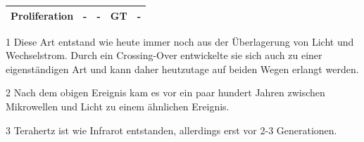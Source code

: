 \begin{table}[hbt]
\begin{threeparttable}
\begin{tabularx}{0.9\textwidth}{lcXcX}
			Proliferation &     -     &         -         &     GT      &        - \\ 
			\bottomrule
		\end{tabularx}
		\begin{tablenotes}
			\item[1] Diese Art entstand wie heute immer noch aus der Überlagerung von Licht und Wechselstrom.
			Durch ein Crossing-Over entwickelte sie sich auch zu einer eigenständigen Art und kann daher heutzutage auf beiden Wegen erlangt werden.
			\item[2] Nach dem obigen Ereignis kam es vor ein paar hundert Jahren zwischen Mikrowellen und Licht zu einem ähnlichen Ereignis.
			\item[3] Terahertz ist wie Infrarot entstanden, allerdings erst vor 2-3 Generationen.
		\end{tablenotes}
	\end{threeparttable} 
\end{table}

